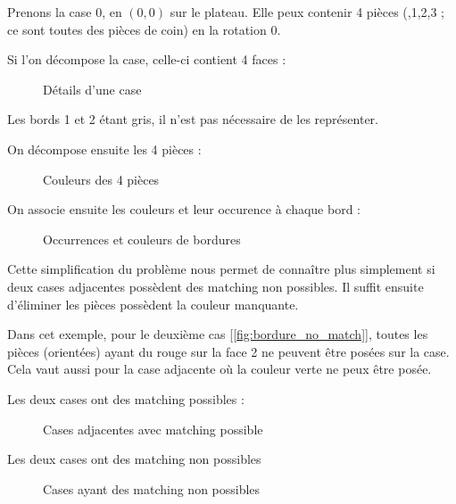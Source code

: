 	\begin{exmp}
		Prenons la case 0, en $(0,0)$ sur le plateau. Elle peux contenir 4 pièces (,1,2,3 ; ce sont toutes des pièces de coin) en la rotation 0.
		
		Si l'on décompose la case, celle-ci contient 4 faces :
		
		\begin{figure}[H]
			

			\caption{Détails d'une case}\label{fig:case}
		\end{figure}
		
		Les bords 1 et 2 étant gris, il n'est pas nécessaire de les représenter. 
		\endminipage\hfill
	
		On décompose ensuite les 4 pièces :
		\begin{figure}[H]
			
			\caption{Couleurs des 4 pièces}\label{fig:4_pieces}
		\end{figure}
		\endminipage\hfill
			On associe ensuite les couleurs et leur occurence à chaque bord :
			\begin{figure}[H]
				
				
				\caption{Occurrences et couleurs de bordures}\label{fig:4_pieces_on_bordure}
			\end{figure}
		\endminipage\hfill
	\end{exmp}
	
	Cette simplification du problème nous permet de connaître plus simplement si deux cases adjacentes possèdent des matching non possibles.  Il suffit ensuite d'éliminer les pièces possèdent la couleur manquante.
		
	\begin{exmp} Dans cet exemple, pour le deuxième cas [\autoref{fig:bordure_no_match}], toutes les pièces (orientées) ayant du rouge sur la face 2 ne peuvent être posées sur la case. Cela vaut aussi pour la case adjacente où la couleur verte ne peux être posée.
			
		\minipage[t]{0.45\textwidth}
			Les deux cases ont des matching possibles :
			
			\begin{figure}[H]
				
				\caption{Cases adjacentes avec matching possible}\label{fig:bordure_match}
			\end{figure}
		
		\endminipage\hfill
		\minipage[t]{0.45\textwidth}
			Les deux cases ont des matching non possibles
			
			\begin{figure}[H]
				
				\caption{Cases ayant des matching non possibles}\label{fig:bordure_no_match}
			\end{figure}
			\endminipage\hfill
	\end{exmp}
	

